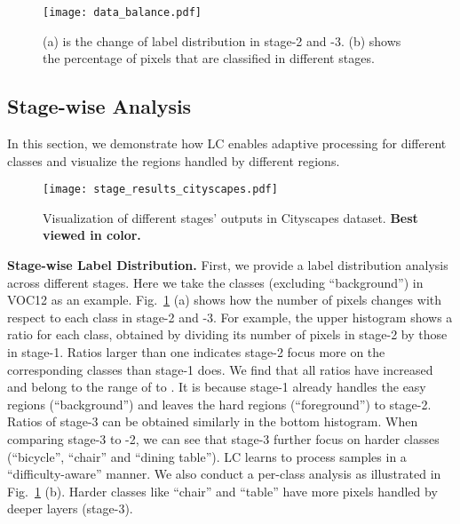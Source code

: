 \documentclass[10pt,twocolumn,letterpaper]{article}
\begin{document}
\begin{figure}
    \centering
    \texttt{[image: data\_balance.pdf]}
    \vskip -0.2cm
    \caption{\small{(a) is the change of label distribution in stage-2 and -3. (b) shows the percentage of pixels that are classified in different stages.}}
    \label{fig:data_balance}
    \vspace{-12pt}
\end{figure}

\subsection{Stage-wise Analysis}
\label{subsec:stage_analysis}

In this section, we demonstrate how LC enables adaptive processing for different classes and visualize the regions handled by different regions. 

\begin{figure*}
    \centering
    \texttt{[image: stage\_results\_cityscapes.pdf]}
    \vskip -0.2cm
    \caption{\small{Visualization of different stages' outputs in Cityscapes dataset. \textbf{Best viewed in color.}}}
    \label{fig:stage_results_cityscapes}
\end{figure*}

\noindent
\textbf{Stage-wise Label Distribution.}
First, we provide a label distribution analysis across different stages. 
Here we take the  classes (excluding ``background'') in VOC12 as an example.
Fig.~\ref{fig:data_balance} (a) shows how the number of pixels changes with respect to each class in stage-2 and -3. For example, the upper histogram shows a ratio for each class, obtained by dividing its number of pixels in stage-2 by those in stage-1. Ratios larger than one indicates stage-2 focus more on the corresponding classes than stage-1 does. 
We find that all ratios have increased and belong to the range of  to .
It is because stage-1 already handles the easy regions (\ie ``background'') and leaves the hard regions (\ie ``foreground'') to stage-2.
Ratios of stage-3 can be obtained similarly in the bottom histogram. When comparing stage-3 to -2, we can see that stage-3 further focus on harder classes (\eg ``bicycle'', ``chair'' and ``dining table'').
LC learns to process samples in a ``difficulty-aware'' manner.
We also conduct a per-class analysis as illustrated in Fig.~\ref{fig:data_balance} (b).
Harder classes like ``chair'' and ``table'' have more pixels handled by deeper layers (stage-3).
\end{document}
